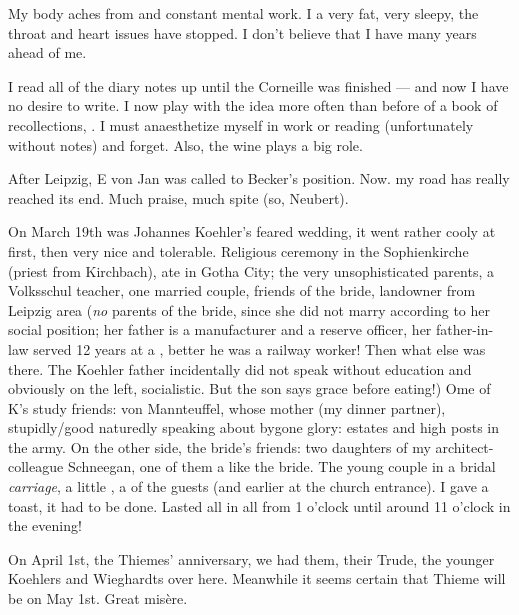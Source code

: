 My body aches from  and constant mental work. I a very fat, very sleepy, the throat and heart issues have stopped. I don't believe that I have many years ahead of me.

I read all of the diary notes up until the Corneille was finished — and now I have no desire to write. I now play with the idea more often than before of a book of recollections, . I must anaesthetize myself in work or reading (unfortunately without notes) and forget. Also, the wine plays a big role.

After Leipzig, E von Jan was called to Becker's position. Now. my road has really reached its end.  Much praise, much spite (so, Neubert).

\missing

On March 19th was Johannes Koehler's feared wedding, it went rather cooly at first, then very nice and tolerable. Religious ceremony in the Sophienkirche (priest from Kirchbach), ate in Gotha City; the very unsophisticated parents, a Volksschul teacher, one married couple, friends of the bride, landowner from Leipzig area (\textit{no} parents of the bride, since she did not marry according to her social position; her father is a manufacturer and a reserve officer, her father-in-law served 12 years at a , better he was a railway worker! Then what else was there. The Koehler father incidentally did not speak without education and obviously on the left, socialistic. But the son says grace before eating!) Ome of K's study friends: von Mannteuffel, whose mother (my dinner partner), stupidly/good naturedly speaking about bygone glory: estates and high posts in the army. On the other side, the bride's friends: two daughters of my architect-colleague Schneegan, one of them a  like the bride.  The young couple in a bridal \textit{carriage}, a little , a  of the guests (and earlier at the church entrance).
I gave a toast, it had to be done. Lasted all in all from 1 o'clock until around 11 o'clock in the evening!

On April 1st, the Thiemes' anniversary, we had them, their Trude, the younger Koehlers and Wieghardts over here. Meanwhile it seems certain that Thieme will be  on May 1st. Great misère.

\missing

